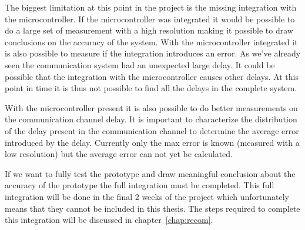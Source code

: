 The biggest limitation at this point in the project is the missing integration with the microcontroller.
If the microcontroller was integrated it would be possible to do a large set of measurement with a high resolution making it possible to draw conclusions on the accuracy of the system.
With the microcontroller integrated it is also possible to measure if the integration introduces an error.
As we've already seen the communication system had an unexpected large delay.
It could be possible that the integration with the microcontroller causes other delays.
At this point in time it is thus not possible to find all the delays in the complete system.

With the microcontroller present it is also possible to do better measurements on the communication channel delay.
It is important to characterize the distribution of the delay present in the communication channel to determine the average error introduced by the delay.
Currently only the max error is known (measured with a low resolution) but the average error can not yet be calculated.

If we want to fully test the prototype and draw meaningful conclusion about the accuracy of the prototype the full integration must be completed.
This full integration will be done in the final 2 weeks of the project which unfortunately means that they cannot be included in this thesis.
The steps required to complete this integration will be discussed in chapter~\ref{chap:recom}.
